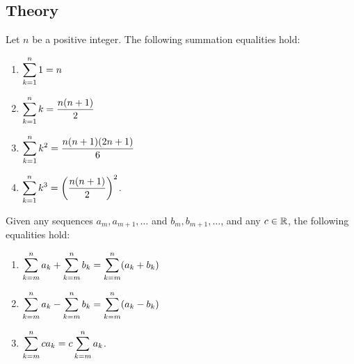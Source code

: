 \subsection*{Theory}
 \begin{namedtheorem} Let $n$ be a positive integer. The following summation equalities hold:
   \begin{enumerate}[topsep=0pt, itemsep=0pt]
     \item $\displaystyle\sum_{k=1}^n 1=n$
     \item $\displaystyle \sum_{k=1}^nk=\frac{n(n+1)}{2}$
     \item $\displaystyle\sum_{k=1}^nk^2=\frac{n(n+1)(2n+1)}{6}$
     \item $\displaystyle \sum_{k=1}^nk^3=\left(\frac{n(n+1)}{2}\right)^2$.
   \end{enumerate}

 \end{namedtheorem}
\begin{namedtheorem}
Given any sequences $a_m, a_{m+1}, \dots$ and $b_m, b_{m+1}, \dots$, and any $c\in {\mathbb R}$, the following equalities hold:
\begin{enumerate}
  \item $\displaystyle\sum_{k=m}^na_k+\sum_{k=m}^nb_k=\sum_{k=m}^n(a_k+b_k)$
  \item $\displaystyle\sum_{k=m}^na_k-\sum_{k=m}^nb_k=\sum_{k=m}^n(a_k-b_k)$
  \item $\displaystyle\sum_{k=m}^nca_k=c\sum_{k=m}^na_k$.
\end{enumerate}

\end{namedtheorem}


